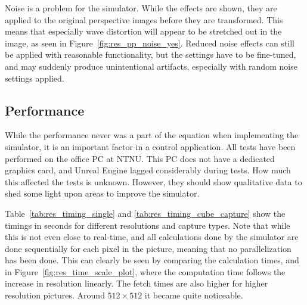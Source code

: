 Noise is a problem for the simulator. While the effects are shown, they are applied to the original perspective images before they are transformed. This means that especially wave distortion will appear to be stretched out in the image, as seen in Figure~\ref{fig:res_pp_noise_yes}. Reduced noise effects can still be applied with reasonable functionality, but the settings have to be fine-tuned, and may suddenly produce unintentional artifacts, especially with random noise settings applied.

\subsection{Performance} \label{sec:res_performance}

While the performance never was a part of the equation when implementing the simulator, it is an important factor in a control application. All tests have been performed on the office PC at NTNU. This PC does not have a dedicated graphics card, and Unreal Engine lagged considerably during tests. How much this affected the tests is unknown. However, they should show qualitative data to shed some light upon areas to improve the simulator.

Table~\ref{tab:res_timing_single} and \ref{tab:res_timing_cube_capture} show the timings in seconds for different resolutions and capture types. Note that while this is not even close to real-time, and all calculations done by the simulator are done sequentially for each pixel in the picture, meaning that no parallelization has been done. This can clearly be seen by comparing the calculation times, and in Figure~\ref{fig:res_time_scale_plot}, where the computation time follows the increase in resolution linearly. The fetch times are also higher for higher resolution pictures. Around $512\times 512$ it became quite noticeable. 


